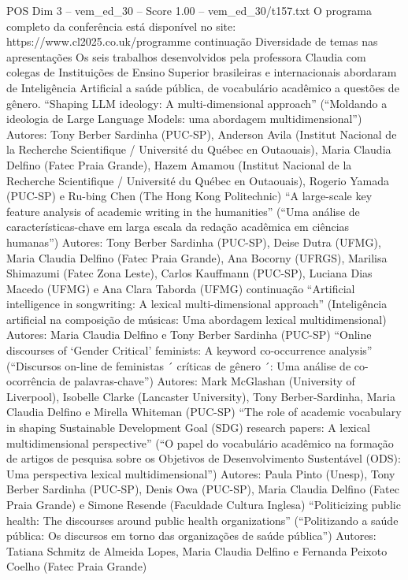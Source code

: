 \begin{textsample}{POS Dim 3 – vem\_ed\_30 – Score 1.00 – vem\_ed\_30/t157.txt}
O programa completo da conferência está disponível no site: https://www.cl2025.co.uk/programme continuação Diversidade de temas nas apresentações Os seis trabalhos desenvolvidos pela professora Claudia com colegas de Instituições de Ensino Superior brasileiras e internacionais abordaram de Inteligência Artificial a saúde pública, de vocabulário acadêmico a questões de gênero. “Shaping LLM ideology: A multi-dimensional approach” (“Moldando a ideologia de Large Language Models: uma abordagem multidimensional”) Autores: Tony Berber Sardinha (PUC-SP), Anderson Avila (Institut Nacional de la Recherche Scientifique / Université du Québec en Outaouais), Maria Claudia Delfino (Fatec Praia Grande), Hazem Amamou (Institut Nacional de la Recherche Scientifique / Université du Québec en Outaouais), Rogerio Yamada (PUC-SP) e Ru-bing Chen (The Hong Kong Politechnic) “A large-scale key feature analysis of academic writing in the humanities” (“Uma análise de características-chave em larga escala da redação acadêmica em ciências humanas”) Autores: Tony Berber Sardinha (PUC-SP), Deise Dutra (UFMG), Maria Claudia Delfino (Fatec Praia Grande), Ana Bocorny (UFRGS), Marilisa Shimazumi (Fatec Zona Leste), Carlos Kauffmann (PUC-SP), Luciana Dias Macedo (UFMG) e Ana Clara Taborda (UFMG) continuação “Artificial intelligence in songwriting: A lexical multi-dimensional approach” (Inteligência artificial na composição de músicas: Uma abordagem lexical multidimensional) Autores: Maria Claudia Delfino e Tony Berber Sardinha (PUC-SP) “Online discourses of ‘Gender Critical’ feminists: A keyword co-occurrence analysis” (“Discursos on-line de feministas ´ críticas de gênero ´: Uma análise de co-ocorrência de palavras-chave”) Autores: Mark McGlashan (University of Liverpool), Isobelle Clarke (Lancaster University), Tony Berber-Sardinha, Maria Claudia Delfino e Mirella Whiteman (PUC-SP) “The role of academic vocabulary in shaping Sustainable Development Goal (SDG) research papers: A lexical multidimensional perspective” (“O papel do vocabulário acadêmico na formação de artigos de pesquisa sobre os Objetivos de Desenvolvimento Sustentável (ODS): Uma perspectiva lexical multidimensional”) Autores: Paula Pinto (Unesp), Tony Berber Sardinha (PUC-SP), Denis Owa (PUC-SP), Maria Claudia Delfino (Fatec Praia Grande) e Simone Resende (Faculdade Cultura Inglesa) “Politicizing public health: The discourses around public health organizations” (“Politizando a saúde pública: Os discursos em torno das organizações de saúde pública”) Autores: Tatiana Schmitz de Almeida Lopes, Maria Claudia Delfino e Fernanda Peixoto Coelho (Fatec Praia Grande)

\end{textsample}
